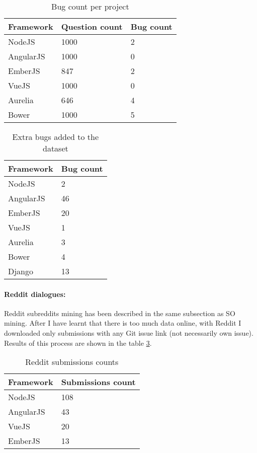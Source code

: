 \begin{table}[H]
\centering
\begin{tabular}{ |p{3cm}||p{3cm}||p{3cm}|}
 \hline
\textbf{ Framework }& \textbf{Question count}& \textbf{Bug count}\\
 \hline
 NodeJS & 1000  & 2 \\ \hline
 AngularJS & 1000  &   0 \\ \hline
 EmberJS & 847 & 2 \\ \hline
 VueJS & 1000 & 0 \\ \hline
 Aurelia & 646 & 4 \\ \hline
 Bower & 1000 & 5 \\ \hline
\end{tabular}
\caption{Bug count per project}
\label{table:SObugQuestionsDistribution}
\end{table}

\begin{table}[H]
\centering
\begin{tabular}{ |p{3cm}||p{3cm}|}
 \hline
\textbf{ Framework }& \textbf{Bug count}\\
 \hline
 NodeJS & 2   \\ \hline
 AngularJS & 46 \\ \hline
 EmberJS & 20 \\ \hline
 VueJS & 1 \\ \hline
 Aurelia & 3 \\ \hline
 Bower & 4 \\ \hline
 Django & 13 \\ \hline
\end{tabular}
\caption{Extra bugs added to the dataset}
\label{table:additionalSObugQuestionsDistribution}
\end{table}

\paragraph{Reddit dialogues:}Reddit subreddits mining has been described in the same subsection as SO mining. After I have learnt that there is too much data online, with Reddit I downloaded only submissions with any Git issue link (not necessarily own issue). Results of this process are shown in the table \ref{table:redditDiscussionsDistribution}.


\begin{table}[H]
\centering
\begin{tabular}{ |p{3cm}||p{3cm}|}
 \hline
\textbf{ Framework }& \textbf{Submissions count}\\
 \hline
 NodeJS   &  108\\ \hline
 AngularJS &   43 \\ \hline
 VueJS & 20\\ \hline
 EmberJS & 13\\ \hline
\end{tabular}
\caption{Reddit submissions counts}
\label{table:redditDiscussionsDistribution}
\end{table}
